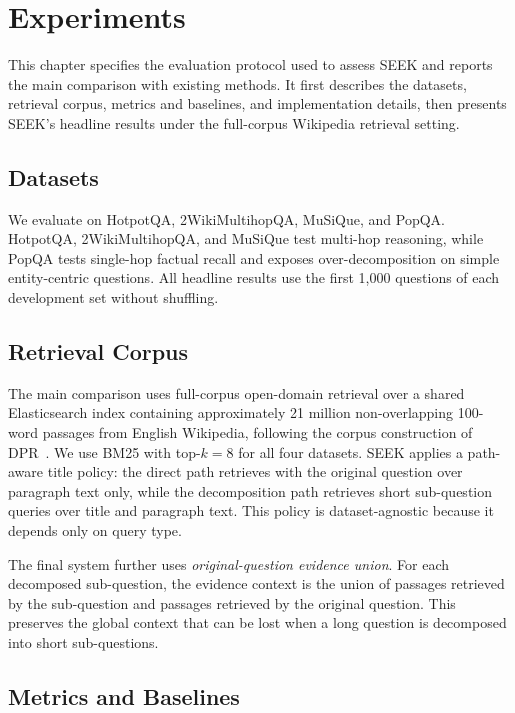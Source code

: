 
\chapter{Experiments}
\label{ch:exp}

This chapter specifies the evaluation protocol used to assess SEEK and reports the main comparison with existing methods. It first describes the datasets, retrieval corpus, metrics and baselines, and implementation details, then presents SEEK's headline results under the full-corpus Wikipedia retrieval setting.

\label{sec:exp-setup}

\section{Datasets}

We evaluate on HotpotQA, 2WikiMultihopQA, MuSiQue, and PopQA. HotpotQA, 2WikiMultihopQA, and MuSiQue test multi-hop reasoning, while PopQA tests single-hop factual recall and exposes over-decomposition on simple entity-centric questions. All headline results use the first 1{,}000 questions of each development set without shuffling.

\section{Retrieval Corpus}

The main comparison uses full-corpus open-domain retrieval over a shared Elasticsearch index containing approximately 21 million non-overlapping 100-word passages from English Wikipedia, following the corpus construction of DPR~\cite{dpr}. We use BM25 with top-$k=8$ for all four datasets. SEEK applies a path-aware title policy: the direct path retrieves with the original question over paragraph text only, while the decomposition path retrieves short sub-question queries over title and paragraph text. This policy is dataset-agnostic because it depends only on query type.

The final system further uses \emph{original-question evidence union}. For each decomposed sub-question, the evidence context is the union of passages retrieved by the sub-question and passages retrieved by the original question. This preserves the global context that can be lost when a long question is decomposed into short sub-questions.

\section{Metrics and Baselines}

